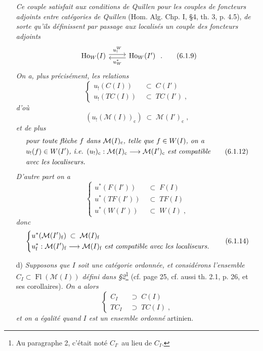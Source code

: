 \documentclass[11pt]{article}
\newcommand{\msp}[1]{\marginpar{\footnotesize [#1]}}
\newcommand{\Fl}{\operatorname{Fl}}
\begin{document}
\begin{itemize}[leftmargin=2.5em]
\msp{page 100}
\textit{Ce couple satisfait aux conditions de Quillen pour les couples de foncteurs adjoints entre catégories de Quillen} (Hom. Alg. Chp. I, §4, th. 3, p. 4.5), \textit{de sorte qu'ils définissent par passage aux localisés un couple des foncteurs adjoints}
\[
\begin{tikzcd}
\mathrm{Ho}_W(I) \arrow[r, shift left, "u_!^{W}"] & \mathrm{Ho}_W(I') \arrow[l, shift left, "u^{*}_{W}"]
\end{tikzcd}
\;.
\tag*{(6.1.9)}
\]
\textit{On a, plus précisément, les relations}
\[
\left\{
\begin{aligned}
u_!(C(I)) \;&\subset\; C(I')\\
u_!(TC(I)) \;&\subset\; TC(I')\;,
\end{aligned}
\right.
\tag*{(6.1.10)}
\]
\textit{d'où}
\[
(u_!(\mathcal{M}(I))_{\mathrm{c}}) \;\subset\; \mathcal{M}(I')_{\mathrm{c}}\;,
\tag*{(6.1.11)}
\]
\textit{et de plus}
\[
\begin{aligned}
&\text{\textit{pour toute flèche $f$ dans $\mathcal{M}(I)_{\mathrm{c}}$, telle que $f \in W(I)$, on a}}\\
&\text{\textit{$u_!(f) \in W(I')$, i.e. $(u_!)_{\mathrm{c}} : \mathcal{M}(I)_{\mathrm{c}} \longrightarrow \mathcal{M}(I')_{\mathrm{c}}$ est compatible}}\\
&\text{\textit{avec les localiseurs.}}
\end{aligned}
\tag*{(6.1.12)}
\]
\textit{D'autre part on a}
\[
\left\{
\begin{aligned}
u^{*}(F(I')) \;&\subset\; F(I)\\
u^{*}(TF(I')) \;&\subset\; TF(I)\\
u^{*}(W(I')) \;&\subset\; W(I)\;,
\end{aligned}
\right.
\tag*{(6.1.13)}
\]
\textit{donc}
\[
\left\{
\begin{aligned}
&u^{*}(\mathcal{M}(I')_{\mathrm{f}}) \;\subset\; \mathcal{M}(I)_{\mathrm{f}}\\
&u^{*}_{\mathrm{f}} : \mathcal{M}(I')_{\mathrm{f}} \longrightarrow \mathcal{M}(I)_{\mathrm{f}} \text{ \textit{est compatible avec les localiseurs.}}
\end{aligned}
\right.
\tag*{(6.1.14)}
\]

\msp{page 101}
\item[d)] \textit{Supposons que $I$ soit une catégorie ordonnée, et considérons l'ensemble $C_I \subset \Fl(\mathcal{M}(I))$ défini dans §2}\footnote[30]{Au paragraphe 2, c'était noté $C_{I^{\circ}}$ au lieu de $C_I$.} (cf. page 25, cf. aussi th. 2.1, p. 26, et ses corollaires). \textit{On a alors}
\[
\left\{
\begin{aligned}
C_I \;&\supset\; C(I)\\
TC_I \;&\supset\; TC(I)\;,
\end{aligned}
\right.
\tag*{(6.1.15)}
\]
\textit{et on a égalité quand $I$ est un ensemble ordonné} artinien.
\end{itemize}
\end{document}
